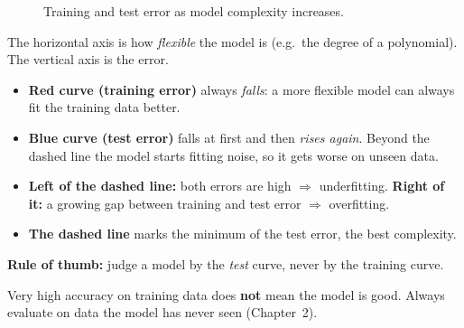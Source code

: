 \begin{figure}[!htbp]
\centering
{}
\caption{Training and test error as model complexity increases.}\label{fig:complexity}
\end{figure}

\begin{explain}
The horizontal axis is how \emph{flexible} the model is (e.g.\ the degree of a polynomial). The vertical axis is the error.
\begin{itemize}
  \item \textbf{Red curve (training error)} always \emph{falls}: a more flexible model can always fit the training data better.
  \item \textbf{Blue curve (test error)} falls at first and then \emph{rises again}. Beyond the dashed line the model starts fitting noise, so it gets worse on unseen data.
  \item \textbf{Left of the dashed line:} both errors are high $\Rightarrow$ underfitting. \textbf{Right of it:} a growing gap between training and test error $\Rightarrow$ overfitting.
  \item \textbf{The dashed line} marks the minimum of the test error, the best complexity.
\end{itemize}
\textbf{Rule of thumb:} judge a model by the \emph{test} curve, never by the training curve.
\end{explain}

\begin{warning}
Very high accuracy on training data does \textbf{not} mean the model is good. Always evaluate on data the model has never seen (Chapter~2).
\end{warning}

